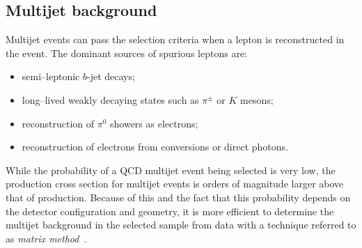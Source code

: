 \subsection{Multijet background}
\label{sec:qcdbckg}

Multijet events can pass the selection criteria when a lepton is
reconstructed in the event. The dominant sources of spurious leptons
are:
\begin{itemize}
\item semi--leptonic $b$-jet decays;
\item long--lived weakly decaying states such as $\pi^{\pm}$ or $K$
  mesons;
\item reconstruction of $\pi^0$ showers as electrons;
\item reconstruction of electrons from conversions or direct photons.
\end{itemize}

While the probability of a QCD multijet event being selected is very
low, the production cross section for multijet events is orders of
magnitude larger above that of \ttbar{} production.
Because of this and the fact that this probability depends on the
detector configuration and geometry, it is more efficient to
determine the multijet background in the selected sample from data
with a technique referred to as {\it matrix method}~\cite{matrixmethod}.

